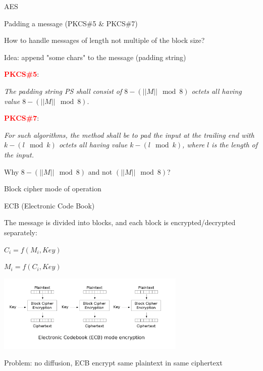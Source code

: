 \begin{frame}{AES}

\end{frame}

\begin{frame}{Padding a message (PKCS\#5 \& PKCS\#7)}


How to handle messages of length not multiple of the block size?

\smallskip

Idea: append "some chars" to the message (padding string)

\bigskip

\textcolor{red}{\textbf{PKCS\#5}}:

\textit{The padding string PS shall consist of $8 - (||M|| \mod 8)$ octets all having value $8 - (||M|| \mod 8).$}

\bigskip

\textcolor{red}{\textbf{PKCS\#7}}:

\textit{For such algorithms, the method shall be to pad the input at the trailing end with $k - (l \mod k)$ octets all having value $k - (l \mod k)$, where $l$ is the length of the input.}

\bigskip

Why $8 - (||M|| \mod 8)$ and not $(||M|| \mod 8)$?

\end{frame}

\begin{frame}{Block cipher mode of operation}

\end{frame}

\begin{frame}{ECB (Electronic Code Book)}

The message is divided into blocks, and each block is encrypted/decrypted separately:

\medskip

\centerline{$C_i = f(M_i, Key)$}

\centerline{$M_i = f(C_i, Key)$}

\medskip

\centerline{\includegraphics[width=9cm]{img/ECB.png}}

\medskip

Problem: no diffusion, ECB encrypt same plaintext in same ciphertext

\end{frame}

